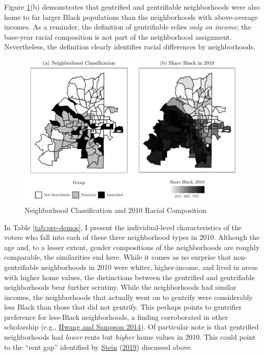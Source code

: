 \documentclass[
  12pt,
]{article}
\begin{document}
Figure \ref{fig:maps}(b) demonstrates that gentrified and gentrifiable neighborhoods were also home to far larger Black populations than the neighborhoods with above-average incomes. As a reminder, the definition of gentrifiable relies \emph{only on income}; the base-year racial composition is not part of the neighborhood assignment. Nevertheless, the definition clearly identifies racial differences by neighborhoods.

\begin{figure}[H]

{\centering \includegraphics{gentrification_files/figure-latex/maps-1} 

}

\caption{\label{fig:maps}Neighborhood Classification and 2010 Racial Composition}\label{fig:maps}
\end{figure}

In Table \ref{tab:pre-demos}, I present the individual-level characteristics of the voters who fall into each of these three neighborhood types in 2010. Although the age and, to a lesser extent, gender compositions of the neighborhoods are roughly comparable, the similarities end here. While it comes as no surprise that non-gentrifiable neighborhoods in 2010 were whiter, higher-income, and lived in areas with higher home values, the distinctions between the gentrified and gentrifiable neighborhoods bear further scrutiny. While the neighborhoods had similar incomes, the neighborhoods that actually went on to gentrify were considerably less Black than those that did not gentrify. This perhaps points to gentrifier preference for less-Black neighborhoods, a finding corroborated in other scholarship (e.g., \protect\hyperlink{ref-Hwang2014}{Hwang and Sampson 2014}). Of particular note is that gentrified neighborhoods had \emph{lower} rents but \emph{higher} home values in 2010. This could point to the ``rent gap'' identified by \protect\hyperlink{ref-Stein2019}{Stein} (\protect\hyperlink{ref-Stein2019}{2019}) discussed above.
\end{document}
